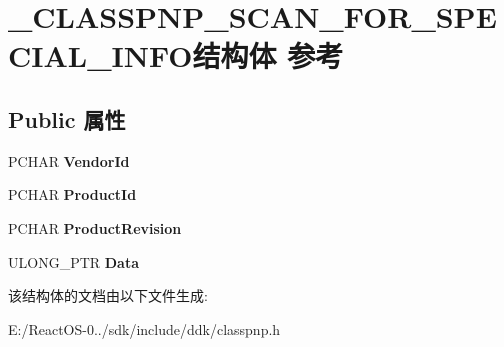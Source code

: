 \hypertarget{struct___c_l_a_s_s_p_n_p___s_c_a_n___f_o_r___s_p_e_c_i_a_l___i_n_f_o}{}\section{\+\_\+\+C\+L\+A\+S\+S\+P\+N\+P\+\_\+\+S\+C\+A\+N\+\_\+\+F\+O\+R\+\_\+\+S\+P\+E\+C\+I\+A\+L\+\_\+\+I\+N\+F\+O结构体 参考}
\label{struct___c_l_a_s_s_p_n_p___s_c_a_n___f_o_r___s_p_e_c_i_a_l___i_n_f_o}
\subsection*{Public 属性}
\begin{DoxyCompactItemize}
\item 
\mbox{\label{struct___c_l_a_s_s_p_n_p___s_c_a_n___f_o_r___s_p_e_c_i_a_l___i_n_f_o_a7097127902e182356e3bc00b0f8a0603}} 
P\+C\+H\+AR {\bfseries Vendor\+Id}
\item 
\mbox{\label{struct___c_l_a_s_s_p_n_p___s_c_a_n___f_o_r___s_p_e_c_i_a_l___i_n_f_o_a5475a6a66e44f73ca6c43311f8369d7a}} 
P\+C\+H\+AR {\bfseries Product\+Id}
\item 
\mbox{\label{struct___c_l_a_s_s_p_n_p___s_c_a_n___f_o_r___s_p_e_c_i_a_l___i_n_f_o_af2073d964a6b372df24cd321e1eef889}} 
P\+C\+H\+AR {\bfseries Product\+Revision}
\item 
\mbox{\label{struct___c_l_a_s_s_p_n_p___s_c_a_n___f_o_r___s_p_e_c_i_a_l___i_n_f_o_aa136786e3c8f289b0a68e842db4fff4c}} 
U\+L\+O\+N\+G\+\_\+\+P\+TR {\bfseries Data}
\end{DoxyCompactItemize}


该结构体的文档由以下文件生成\+:\begin{DoxyCompactItemize}
\item 
E\+:/\+React\+O\+S-\/0../sdk/include/ddk/classpnp.\+h\end{DoxyCompactItemize}
